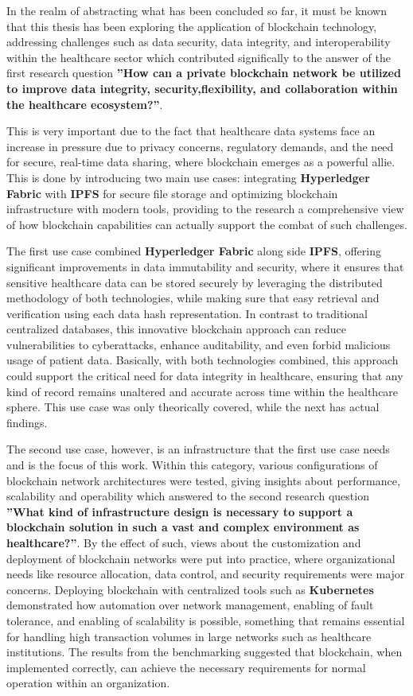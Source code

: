 In the realm of abstracting what has been concluded so far, it must be known that this thesis has been exploring the application of blockchain technology, addressing challenges such as data security, data integrity, and interoperability within the healthcare sector which contributed significally to the answer of the first research question \textbf{”How can a private blockchain network be utilized to improve data integrity, security,flexibility, and collaboration within the healthcare ecosystem?”}.

This is very important due to the fact that healthcare data systems face an increase in pressure due to privacy concerns, regulatory demands, and the need for secure, real-time data sharing, where blockchain emerges as a powerful allie. This is done by introducing two main use cases: integrating \textbf{Hyperledger Fabric} with \textbf{IPFS} for secure file storage and optimizing blockchain infrastructure with modern tools, providing to the research a comprehensive view of how blockchain capabilities can actually support the combat of such challenges.

The first use case combined \textbf{Hyperledger Fabric} along side \textbf{IPFS}, offering significant improvements in data immutability and security, where it ensures that sensitive healthcare data can be stored securely by leveraging the distributed methodology of both technologies, while making sure that easy retrieval and verification using each data hash representation. In contrast to traditional centralized databases, this innovative blockchain approach can reduce vulnerabilities to cyberattacks, enhance auditability, and even forbid malicious usage of patient data. Basically, with both technologies combined, this approach could support the critical need for data integrity in healthcare, ensuring that any kind of record remains unaltered and accurate across time within the healthcare sphere. This use case was only theorically covered, while the next has actual findings.

The second use case, however, is an infrastructure that the first use case needs and is the focus of this work. Within this category, various configurations of blockchain network architectures were tested, giving insights about performance, scalability and operability which answered to the second research question  \textbf{”What kind of infrastructure design is necessary to support a blockchain solution in such a vast and complex environment as healthcare?”}. By the effect of such, views about the customization and deployment of blockchain networks were put into practice, where organizational needs like resource allocation, data control, and security requirements were major concerns. Deploying blockchain with centralized tools such as \textbf{Kubernetes} demonstrated how automation over network management, enabling of fault tolerance, and enabling of scalability is possible, something that remains essential for handling high transaction volumes in large networks such as healthcare institutions. The results from the benchmarking suggested that blockchain, when implemented correctly, can achieve the necessary requirements for normal operation within an organization.

